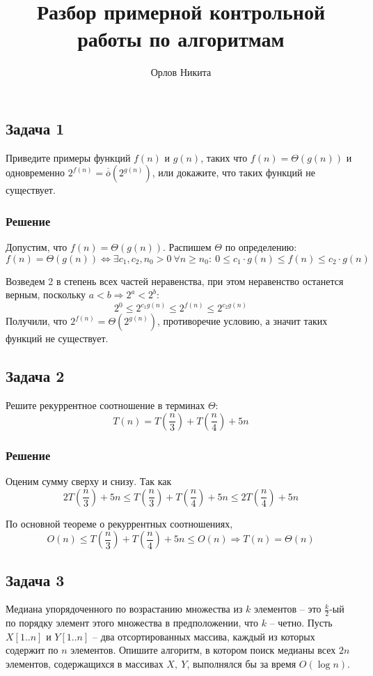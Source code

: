\documentclass[a4letter,12pt]{article}
\newcommand{\doverline}[1]{\overline{\overline{#1}}}
\begin{document}
	\title{Разбор примерной контрольной работы по алгоритмам}
	\author{Орлов Никита}
	\maketitle
	
	\subsection*{Задача 1}	
	Приведите примеры функций $f(n)$ и $g(n)$, таких что $f(n) = \Theta(g(n))$ и одновременно $2^{f(n)} = \doverline{o}(2^{g(n)})$, или докажите, что таких функций не существует.
	
	\subsubsection*{Решение}
	Допустим, что $f(n) = \Theta(g(n))$. Распишем $\Theta$ по определению:
	\[
	f(n) = \Theta(g(n))
	\Leftrightarrow
	\exists c_1, c_2,n_0 > 0 \ \forall n\geqslant n_0: \
	0\leqslant c_1\cdot g(n)\leqslant f(n) \leqslant c_2 \cdot g(n)
	\]
	
	Возведем 2 в степень всех частей неравенства, при этом неравенство останется верным, поскольку $a < b \Rightarrow 2^a < 2^b$:
	\[
	2^0 \leqslant 2^{c_1g(n)} \leqslant 2^{f(n)} \leqslant 2^{c_2g(n)}
	\]
	Получили, что $2^{f(n)} = \Theta(2^{g(n)})$, противоречие условию, а значит таких функций не существует.
	
	\subsection*{Задача 2}
	
	Решите рекуррентное соотношение в терминах $\Theta$:
	\[
	T(n) = T\left(\frac n3\right) + T\left(\frac n4\right) + 5n
	\]
	
	\subsubsection*{Решение}
	Оценим сумму сверху и снизу. Так как
	\[
	2T\left(\frac n3\right)+5n \leqslant  T\left(\frac n3\right) + T\left(\frac n4\right) + 5n \leqslant 2T\left(\frac n4\right) + 5n
	\]
	
	По основной теореме о рекуррентных соотношениях,
	\[
	O(n) \leqslant T\left(\frac n3\right) + T\left(\frac n4\right) + 5n \leqslant O(n) \Rightarrow T(n) = \Theta(n)
	\]
	\subsection*{Задача 3}
	Медиана упорядоченного по возрастанию множества из $k$ элементов -- это $\frac k2$-ый по порядку элемент этого множества в предположении, что $k$ -- четно. Пусть $X[1..n]$ и $Y[1..n]$ -- два отсортированных массива, каждый из которых содержит по $n$ элементов. Опишите алгоритм, в котором поиск медианы всех $2n$ элементов, содержащихся в массивах $X, \ Y$, выполнялся бы за время $O(\log n)$.
	
\end{document}
